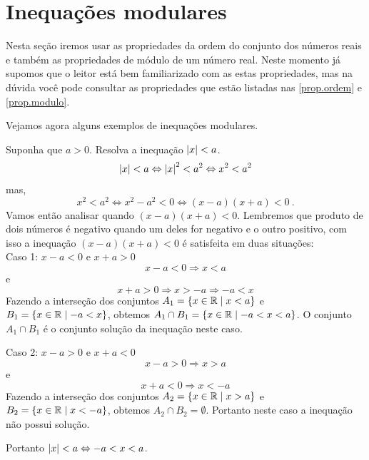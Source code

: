  \section{Inequações modulares}

 Nesta seção iremos usar as propriedades da ordem do conjunto dos números reais e também as propriedades de módulo de um número real. Neste momento já supomos que o leitor está bem familiarizado com as estas propriedades, mas na dúvida você pode consultar as propriedades que estão listadas nas \autoref{prop.ordem} e \autoref{prop.modulo}.

Vejamos agora alguns exemplos de inequações modulares.

 \begin{exem} 
  Suponha que $a> 0$. Resolva a inequação $\left|x\right| < a$.
\begin{equation}
\left|x\right| < a \Leftrightarrow \left|x\right|^2 < a^2 \Leftrightarrow x^2 < a^2
\end{equation}
   mas,
\begin{equation}
x^2 < a^2 \Leftrightarrow x^2 - a^2 < 0 \Leftrightarrow (x-a)(x+a) < 0 \ .
\end{equation}
   Vamos então analisar quando $(x-a)(x+a) < 0$. Lembremos que produto de dois números é negativo quando um deles for negativo e o outro positivo, com isso a inequação $(x-a)(x+a) < 0$ é satisfeita em duas situações:\\
   Caso 1: $x-a<0$ e $x+a>0$
\begin{equation}
x-a<0 \Rightarrow x< a
\end{equation}
   e
\begin{equation}
x+a>0 \Rightarrow x>-a \Rightarrow -a< x
\end{equation}
  Fazendo a interseção dos conjuntos $A_1= \left\{ x \in \mathbb{R} \mid x<a \right\}$ e $B_1= \left\{ x \in \mathbb{R} \mid -a<x \right\}$, obtemos $A_1 \cap B_1= \left\{ x \in \mathbb{R} \mid -a< x <a \right\}$. O conjunto $A_1 \cap B_1$ é o conjunto solução da inequação neste caso.


   Caso 2: $x-a>0$ e $x+a<0$
\begin{equation}
x-a> 0 \Rightarrow x> a
\end{equation}
   e
\begin{equation}
x+a< 0 \Rightarrow x<-a
\end{equation}
   Fazendo a interseção dos conjuntos $A_2= \left\{ x \in \mathbb{R} \mid x> a \right\}$ e $B_2= \left\{ x \in \mathbb{R} \mid x<-a \right\}$, obtemos $A_2 \cap B_2= \emptyset$. Portanto neste caso a inequação não possui solução.

  Portanto $\left|x\right| < a \Leftrightarrow -a< x <a$.
  \end{exem}
  
